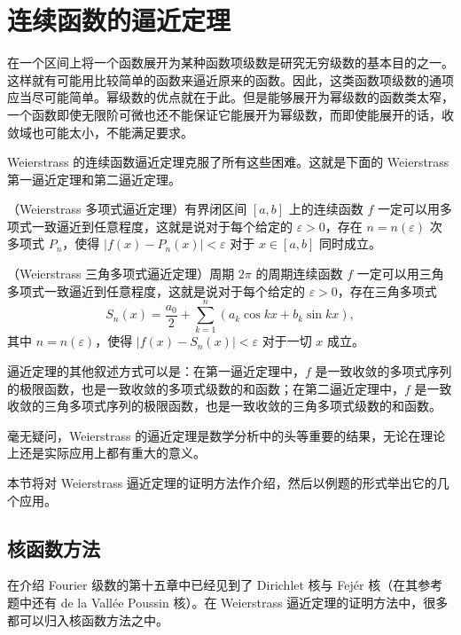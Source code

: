 \section{连续函数的逼近定理}

在一个区间上将一个函数展开为某种函数项级数是研究无穷级数的基本目的之一。这样就有可能用比较简单的函数来逼近原来的函数。因此，这类函数项级数的通项应当尽可能简单。幂级数的优点就在于此。但是能够展开为幂级数的函数类太窄，一个函数即使无限阶可微也还不能保证它能展开为幂级数，而即使能展开的话，收敛域也可能太小，不能满足要求。

Weierstrass 的连续函数逼近定理克服了所有这些困难。这就是下面的 Weierstrass 第一逼近定理和第二逼近定理。

\begin{xproposition}[16.3.1]
（Weierstrass 多项式逼近定理）有界闭区间 $[a,b]$ 上的连续函数 $f$ 一定可以用多项式一致逼近到任意程度，这就是说对于每个给定的 $\varepsilon>0$，存在 $n=n(\varepsilon)$ 次多项式 $P_n$，使得 $|f(x)-P_n(x)|<\varepsilon$ 对于 $x\in[a,b]$ 同时成立。
\end{xproposition}

\begin{xproposition}[16.3.2]
（Weierstrass 三角多项式逼近定理）周期 $2\pi$ 的周期连续函数 $f$ 一定可以用三角多项式一致逼近到任意程度，这就是说对于每个给定的 $\varepsilon>0$，存在三角多项式
\[
  S_n(x)=\frac{a_0}{2}+\sum_{k=1}^n(a_k\cos kx+b_k\sin kx),
\]
其中 $n=n(\varepsilon)$，使得 $|f(x)-S_n(x)|<\varepsilon$ 对于一切 $x$ 成立。
\end{xproposition}

\begin{xremark}
逼近定理的其他叙述方式可以是：在第一逼近定理中，$f$ 是一致收敛的多项式序列的极限函数，也是一致收敛的多项式级数的和函数；在第二逼近定理中，$f$ 是一致收敛的三角多项式序列的极限函数，也是一致收敛的三角多项式级数的和函数。
\end{xremark}

毫无疑问，Weierstrass 的逼近定理是数学分析中的头等重要的结果，无论在理论上还是实际应用上都有重大的意义。

本节将对 Weierstrass 逼近定理的证明方法作介绍，然后以例题的形式举出它的几个应用。

\subsection{核函数方法}

在介绍 Fourier 级数的第十五章中已经见到了 Dirichlet 核与 Fejér 核（在其参考题中还有 de la Vallée Poussin 核）。在 Weierstrass 逼近定理的证明方法中，很多都可以归入核函数方法之中。

